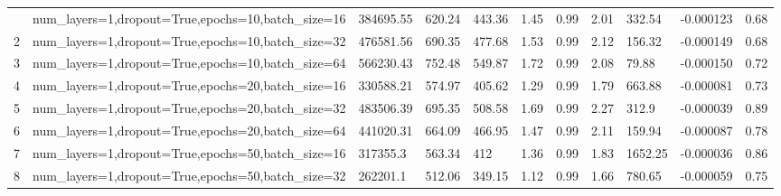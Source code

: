 \begin{longtable}{C{0.8cm} L{2cm} C{1.15cm} C{1.15cm} C{1.15cm} C{1.15cm} C{0.85cm} C{1.25cm} C{1.2cm} C{1.5cm} C{1.0cm}}
\bottomrule
{} & num\_layers=1,\newline dropout=True,\newline epochs=10,\newline batch\_size=16 & 384695.55 & 620.24 & 443.36 & 1.45 & 0.99 & 2.01 & 332.54 & -0.000123 & 0.68 \\
2 & num\_layers=1,\newline dropout=True,\newline epochs=10,\newline batch\_size=32 & 476581.56 & 690.35 & 477.68 & 1.53 & 0.99 & 2.12 & 156.32 & -0.000149 & 0.68 \\
3 & num\_layers=1,\newline dropout=True,\newline epochs=10,\newline batch\_size=64 & 566230.43 & 752.48 & 549.87 & 1.72 & 0.99 & 2.08 & 79.88 & -0.000150 & 0.72 \\
4 & num\_layers=1,\newline dropout=True,\newline epochs=20,\newline batch\_size=16 & 330588.21 & 574.97 & 405.62 & 1.29 & 0.99 & 1.79 & 663.88 & -0.000081 & 0.73 \\
5 & num\_layers=1,\newline dropout=True,\newline epochs=20,\newline batch\_size=32 & 483506.39 & 695.35 & 508.58 & 1.69 & 0.99 & 2.27 & 312.9 & -0.000039 & 0.89 \\
6 & num\_layers=1,\newline dropout=True,\newline epochs=20,\newline batch\_size=64 & 441020.31 & 664.09 & 466.95 & 1.47 & 0.99 & 2.11 & 159.94 & -0.000087 & 0.78 \\
7 & num\_layers=1,\newline dropout=True,\newline epochs=50,\newline batch\_size=16 & 317355.3 & 563.34 & 412 & 1.36 & 0.99 & 1.83 & 1652.25 & -0.000036 & 0.86 \\
8 & num\_layers=1,\newline dropout=True,\newline epochs=50,\newline batch\_size=32 & 262201.1 & 512.06 & 349.15 & 1.12 & 0.99 & 1.66 & 780.65 & -0.000059 & 0.75 \\

\end{longtable}
